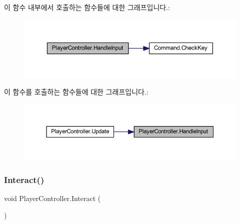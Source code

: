 \begin{DoxyCode}{0}

\end{DoxyCode}
이 함수 내부에서 호출하는 함수들에 대한 그래프입니다.\+:\nopagebreak
\begin{figure}[H]
\begin{center}
\leavevmode
\includegraphics[width=350pt]{dc/dde/class_player_controller_a5ebfe098b2dc258ca8349e6951766883_cgraph}
\end{center}
\end{figure}
이 함수를 호출하는 함수들에 대한 그래프입니다.\+:\nopagebreak
\begin{figure}[H]
\begin{center}
\leavevmode
\includegraphics[width=350pt]{dc/dde/class_player_controller_a5ebfe098b2dc258ca8349e6951766883_icgraph}
\end{center}
\end{figure}
\mbox{\label{class_player_controller_a1f27776786e67be2633f94b97c93ebdc}} 
\subsubsection{\texorpdfstring{Interact()}{Interact()}}
{\footnotesize\ttfamily void Player\+Controller.\+Interact (\begin{DoxyParamCaption}{ }\end{DoxyParamCaption})}



